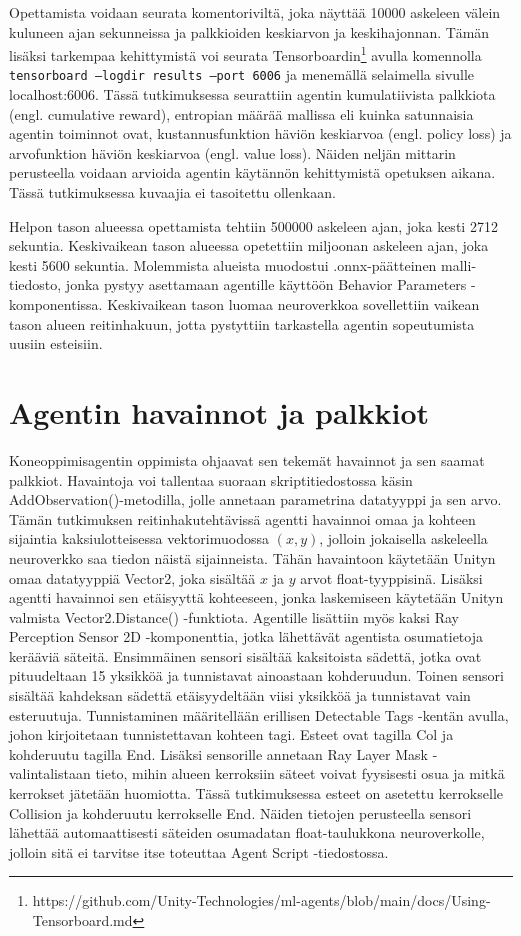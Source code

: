 \documentclass[utf8]{gradu3}
\begin{document}
Opettamista voidaan seurata komentoriviltä, joka näyttää 10000 askeleen välein kuluneen ajan sekunneissa ja palkkioiden keskiarvon ja keskihajonnan. Tämän lisäksi tarkempaa kehittymistä voi seurata Tensorboardin\footnote{https://github.com/Unity-Technologies/ml-agents/blob/main/docs/Using-Tensorboard.md} avulla komennolla \texttt{tensorboard --logdir re\-sults --port 6006} ja menemällä selaimella sivulle localhost:6006. Tässä tutkimuksessa seurattiin agentin kumulatiivista palkkiota (engl. cumulative reward), entropian määrää mallissa eli kuinka satunnaisia agentin toiminnot ovat, kustannusfunktion häviön keskiarvoa (engl. policy loss) ja arvofunktion häviön keskiarvoa (engl. value loss). Näiden neljän mittarin perusteella voidaan arvioida agentin käytännön kehittymistä opetuksen aikana. Tässä tutkimuksessa kuvaajia ei tasoitettu ollenkaan.

Helpon tason alueessa opettamista tehtiin 500000 askeleen ajan, joka kesti 2712 sekuntia. Keskivaikean tason alueessa opetettiin miljoonan askeleen ajan, joka kesti 5600 sekuntia. Molemmista alueista muodostui .onnx-päätteinen malli-tiedosto, jonka pystyy asettamaan agentille käyttöön Behavior Parameters -komponentissa. Keskivaikean tason luomaa neuroverkkoa sovellettiin vaikean tason alueen reitinhakuun, jotta pystyttiin tarkastella agentin sopeutumista uusiin esteisiin.

\section{Agentin havainnot ja palkkiot}
\label{agenttihavainnot}

Koneoppimisagentin oppimista ohjaavat sen tekemät havainnot ja sen saamat palkkiot. Havaintoja voi tallentaa suoraan skriptitiedostossa käsin AddObservation()-metodilla, jolle annetaan parametrina datatyyppi ja sen arvo. Tämän tutkimuksen reitinhakutehtävissä agentti havainnoi omaa ja kohteen sijaintia kaksiulotteisessa vektorimuodossa \((x,y)\), jolloin jokaisella askeleella neuroverkko saa tiedon näistä sijainneista. Tähän havaintoon käytetään Unityn omaa datatyyppiä Vector2, joka sisältää \(x\) ja \(y\) arvot float-tyyppisinä. Lisäksi agentti havainnoi sen etäisyyttä kohteeseen, jonka laskemiseen käytetään Unityn valmista Vector2.Distance() -funktiota. Agentille lisättiin myös kaksi Ray Perception Sensor 2D -kom\-po\-nent\-ti\-a, jotka lähettävät agentista osumatietoja kerääviä säteitä. Ensimmäinen sensori sisältää kaksitoista sädettä, jotka ovat pituudeltaan 15 yksikköä ja tunnistavat ainoastaan kohderuudun. Toinen sensori sisältää kahdeksan sädettä etäisyydeltään viisi yksikköä ja tunnistavat vain esteruutuja. Tunnistaminen määritellään erillisen Detectable Tags -kentän avulla, johon kirjoitetaan tunnistettavan kohteen tagi. Esteet ovat tagilla Col ja kohderuutu tagilla End. Lisäksi sensorille annetaan Ray Layer Mask -valintalistaan tieto, mihin alueen kerroksiin säteet voivat fyysisesti osua ja mitkä kerrokset jätetään huomiotta. Tässä tutkimuksessa esteet on asetettu kerrokselle Collision ja kohderuutu kerrokselle End. Näiden tietojen perusteella sensori lähettää automaattisesti säteiden osumadatan float-taulukkona neuroverkolle, jolloin sitä ei tarvitse itse toteuttaa Agent Script -tiedostossa.
\end{document}
